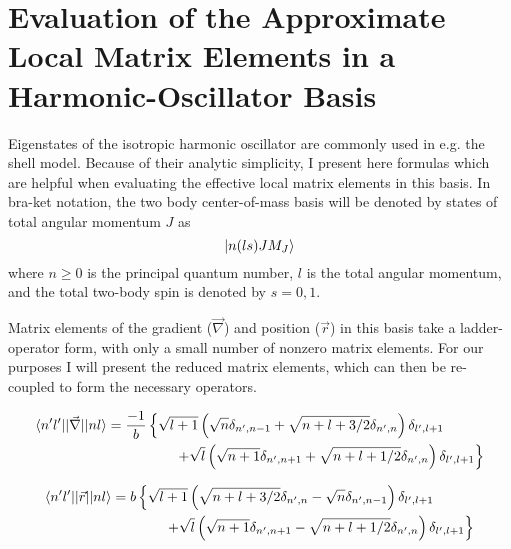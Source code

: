 
\chapter{\label{app:HObasis}Evaluation of the Approximate Local Matrix Elements in a Harmonic-Oscillator Basis}

Eigenstates of the isotropic harmonic oscillator are commonly used in e.g. the shell model. Because of their analytic simplicity, I present here formulas which are helpful when evaluating the effective local matrix elements in this basis. In bra-ket notation, the two body center-of-mass basis will be denoted by states of total angular momentum $J$ as
\begin{equation}
\ket{n(l s) J M_J}
\end{equation}
where $n\geq0$ is the principal quantum number, $l$ is the total angular momentum, and the total two-body spin is denoted by $s=0,1$.

Matrix elements of the gradient ($\vec{\nabla}$) and position ($\vec{r}$) in this basis take a ladder-operator form, with only a small number of nonzero matrix elements. For our purposes I will present the reduced matrix elements, which can then be re-coupled to form the necessary operators.

\begin{equation}\label{eq:gradRME}
\begin{split}
\braket{n'l' || \vec{\nabla} || nl}=\frac{-1}{b}&\left\{\sqrt{l+1}\left(\sqrt{n}\delta_{n',n-1}+\sqrt{n+l+3/2}\delta_{n',n}\right)\delta_{l',l+1}\right.\\
&\left.\quad\quad+\sqrt{l}\left(\sqrt{n+1}\delta_{n',n+1}+\sqrt{n+l+1/2}\delta_{n',n}\right)\delta_{l',l+1}\right\}
\end{split}
\end{equation}

\begin{equation}\label{eq:rRME}
\begin{split}
\braket{n'l' || \vec{r} || nl}=b&\left\{\sqrt{l+1}\left(\sqrt{n+l+3/2}\delta_{n',n}-\sqrt{n}\delta_{n',n-1}\right)\delta_{l',l+1}\right.\\
&\left.\quad\quad+\sqrt{l}\left(\sqrt{n+1}\delta_{n',n+1}-\sqrt{n+l+1/2}\delta_{n',n}\right)\delta_{l',l+1}\right\}
\end{split}
\end{equation}

